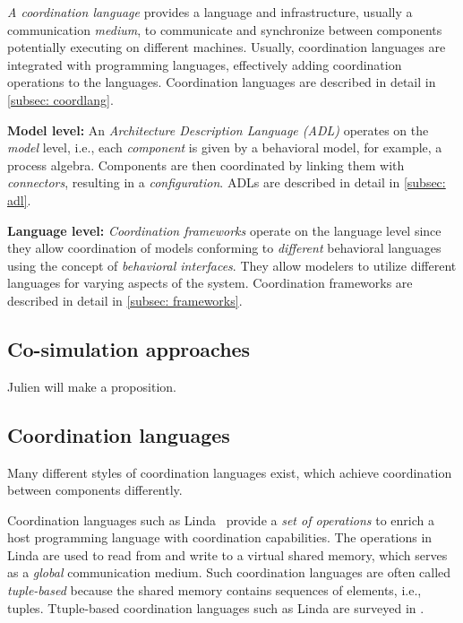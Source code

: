\documentclass[runningheads]{llncs}
\begin{document}
\textit{A coordination language} provides a language and infrastructure, usually a communication \textit{medium}, to communicate and synchronize between components potentially executing on different machines.
Usually, coordination languages are integrated with programming languages, effectively adding coordination operations to the languages.
Coordination languages are described in detail in \autoref{subsec: coordlang}.

\textbf{Model level:}
An \textit{Architecture Description Language (ADL)} operates on the \textit{model} level, i.e., each \textit{component} is given by a behavioral model, for example, a process algebra.
Components are then coordinated by linking them with \textit{connectors}, resulting in a \textit{configuration}.
ADLs are described in detail in \autoref{subsec: adl}.

\textbf{Language level:}
\textit{Coordination frameworks} operate on the language level since they allow coordination of models conforming to \textit{different} behavioral languages using the concept of \textit{behavioral interfaces}.
They allow modelers to utilize different languages for varying aspects of the system.
Coordination frameworks are described in detail in \autoref{subsec: frameworks}.

\subsection{Co-simulation approaches} \label{subsec: cosim}

Julien will make a proposition.

\subsection{Coordination languages} \label{subsec: coordlang}
Many different styles of coordination languages exist, which achieve coordination between components differently.

Coordination languages such as Linda~\cite{carrieroLindaContext1989} provide a \textit{set of operations} to enrich a host programming language with coordination capabilities.
The operations in Linda are used to read from and write to a virtual shared memory, which serves as a \textit{global} communication medium.
Such coordination languages are often called \textit{tuple-based} because the shared memory contains sequences of elements, i.e., tuples.
Ttuple-based coordination languages such as Linda are surveyed in \cite{rossiTuplebasedTechnologiesCoordination2001,nixonTuplespacebasedComputingSemantic2008,omiciniCoordinationModelsLanguages2011}.
\end{document}
